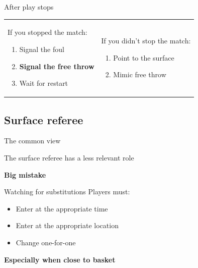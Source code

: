 \documentclass{beamer}
\begin{document}
    \begin{frame}{After play stops}
        \begin{tabular}{ll}
            \parbox{0.5\linewidth}
            {
                If you stopped the match:
                \begin{enumerate}
                    \item Signal the foul
                    \item \textbf{Signal the free throw}
                    \item Wait for restart
                \end{enumerate}

                \pause
            }
            &
            \parbox{0.5\linewidth}
            {
                If you didn't stop the match:
                \begin{enumerate}
                    \item Point to the surface
                    \item Mimic free throw
                \end{enumerate}
            }
        \end{tabular}
    \end{frame}

    \subsection{Surface referee}

    \begin{frame}{The common view}
        \begin{center}
        The surface referee has a less relevant role \pause

        \textbf{Big mistake}
        \end{center}
    \end{frame}

    \begin{frame}{Watching for substitutions}
        Players must:
        \begin{itemize}
            \item Enter at the appropriate time
            \item Enter at the appropriate location
            \item Change one-for-one
        \end{itemize}

        \pause

        \textbf{Especially when close to basket}
    \end{frame}
\end{document}
